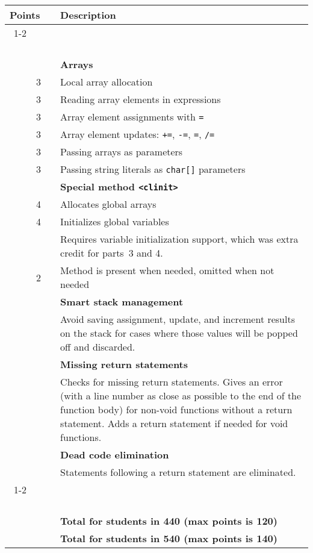 \documentclass{article}
\makeatletter
\newcommand{\gradeline}{ \cline{1-2} \cline{4-4} ~\\[-1.5ex] }
\newenvironment{gradetable}{\begin{longtable}{@{~~}rrcp{5in}} \multicolumn{2}{l}{\bf Points} & & {\bf Description}\\ \gradeline}{\end{longtable}}
\newcommand{\mainitem}[2]{\pagebreak[2] {\bf #1} &&& {\bf #2}}
\newcommand{\mainpara}[1]{~ &&& {#1} }
\newcommand{\inneritem}[2]{~ & #1 && #2}
\newcommand{\innerpara}[1]{~ & ~ && #1}
\newcommand{\parser}{3}
\newcommand{\typecheck}{4}
\makeatother
\begin{document}
\begin{gradetable}
  \mainitem{18}{Arrays}
  \\[1mm]
  \inneritem{3}{Local array allocation}
  \\[1mm]
  \inneritem{3}{Reading array elements in expressions}
  \\[1mm]
  \inneritem{3}{Array element assignments with {\tt =}}
  \\[1mm]
  \inneritem{3}{Array element updates: {\tt +=}, {\tt -=}, {\tt *=}, {\tt /=}}
  \\[1mm]
  \inneritem{3}{Passing arrays as parameters}
  \\[1mm]
  \inneritem{3}{Passing string literals as {\tt char[]} parameters}
  \\[4mm]

  \mainitem{10}{Special method {\tt <clinit>}}
  \\[1mm]
  \inneritem{4}{Allocates global arrays}
  \\[1mm]
  \inneritem{4}{Initializes global variables}
  \\
  \innerpara{%
    Requires variable initialization support,
    which was extra credit for parts~\parser{} and \typecheck{}.
  }
  \\[1mm]
  \inneritem{2}{Method is present when needed, omitted when not needed}
  \\[4mm]

  \mainitem{4}{Smart stack management}
  \\[1mm]
  \mainpara{%
    Avoid saving assignment, update, and increment results on
    the stack for cases where those values will be popped off
    and discarded.
  }
  \\[4mm]

  \mainitem{4}{Missing return statements}
  \\[1mm]
  \mainpara{%
    Checks for missing return statements.
    Gives an error (with a line number as close as possible
    to the end of the function body) for non-void functions
    without a return statement.
    Adds a return statement if needed for void functions.
  }
  \\[4mm]

  \mainitem{4}{Dead code elimination}
  \\[1mm]
  \mainpara{%
    Statements following a return statement
    are eliminated.
  }
  \\[4mm]

  \gradeline
  \mainitem{100}{Total for students in 440 (max points is 120)}
  \\
  \mainitem{120}{Total for students in 540 (max points is 140)}
\end{gradetable}
\end{document}
